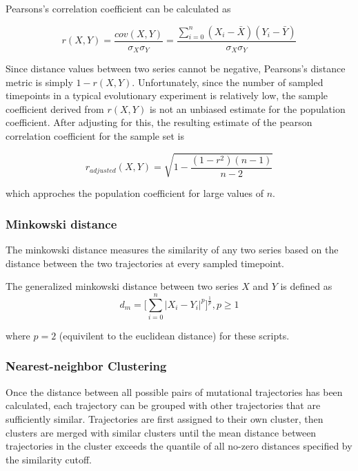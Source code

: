 \documentclass{report}
\begin{document}
Pearsons's correlation coefficient can be calculated as

\begin{equation}
r(X,Y) = \frac{cov(X,Y)}{\sigma_X \sigma_Y} =
\frac{\sum_{i=0}^n (X_i-\bar{X})(Y_i-\bar{Y})}{\sigma_X \sigma_Y}
\end{equation}

Since distance values between two series cannot be negative, Pearsons's distance metric is simply $1-r(X,Y)$. Unfortunately, since the number of sampled timepoints in a typical evolutionary experiment is relatively low, the sample coefficient derived from $r(X,Y)$ is not an unbiased estimate for the population coefficient. After adjusting for this, the resulting estimate of the pearson correlation coefficient for the sample set is

\begin{equation}
r_{adjusted}(X,Y) = \sqrt{1-\frac{(1-r^2)(n-1)}{n-2}}
\end{equation}

which approches the population coefficient for large values of $n$.


\subsubsection{Minkowski distance}
The minkowski distance measures the similarity of any two series based on the distance between the two trajectories at every sampled timepoint.

The generalized minkowski distance between two series $X$ and $Y$ is defined as
\begin{equation}
d_m=\bigg[\sum_{i=0}^n|X_i-Y_i|^p\bigg]^\frac{1}{p}, p \ge 1
\end{equation}

where $p=2$ (equivilent to the euclidean distance) for these scripts.

\subsubsection{Nearest-neighbor Clustering}

Once the distance between all possible pairs of mutational trajectories has been calculated, 
each trajectory can be grouped with other trajectories that are sufficiently similar. 
Trajectories are first assigned to their own cluster, 
then clusters are merged with similar clusters until the mean distance between trajectories in the cluster exceeds the quantile of all no-zero distances
specified by the similarity cutoff.
\end{document}
